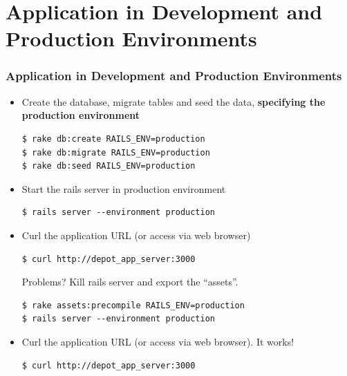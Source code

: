 \documentclass{beamer}
\newcommand{\comment}[2]{#2}
\begin{document}
\section{Application in Development and Production Environments}
\begin{frame}
\frametitle{Application in Development and Production Environments}
\begin{itemize}


\comment{
\item Edit \texttt{config/database.yml} file (configuration database file) in order to run the application with \texttt{PostgreSQL}
\lstset{language=Ruby, style=eclipse, numbers=left}
\begin{lstlisting}[escapechar=!]
!\vdots!
production:
  adapter: postgresql
  encoding: unicode
  database: depot_app_production
  pool: 5
  username: depot_app
  password: 12345678 # This is the password we suggested
!\vdots!
\end{lstlisting}
}


\item Create the database, migrate tables and seed the data, \textbf{specifying the production environment}

\lstset{language=shell, style=eclipse}
\begin{lstlisting}[numbers=none, escapechar=!]
$ rake db:create RAILS_ENV=production
$ rake db:migrate RAILS_ENV=production
$ rake db:seed RAILS_ENV=production
\end{lstlisting}

\item Start the rails server in production environment
\lstset{language=shell}
\begin{lstlisting}[escapechar=!]
$ rails server --environment production
\end{lstlisting}

\item Curl the application URL (or access via web browser)

\lstset{language=shell}
\begin{lstlisting}[escapechar=!]
$ curl http://depot_app_server:3000
\end{lstlisting}

Problems? Kill rails server and export the ``assets''. 

\lstset{language=shell}
\begin{lstlisting}[escapechar=!]
$ rake assets:precompile RAILS_ENV=production
$ rails server --environment production
\end{lstlisting}

\item Curl the application URL (or access via web browser). It works!
\lstset{language=shell}
\begin{lstlisting}[escapechar=!]
$ curl http://depot_app_server:3000
\end{lstlisting}
\end{itemize}

\end{frame}
\end{document}
